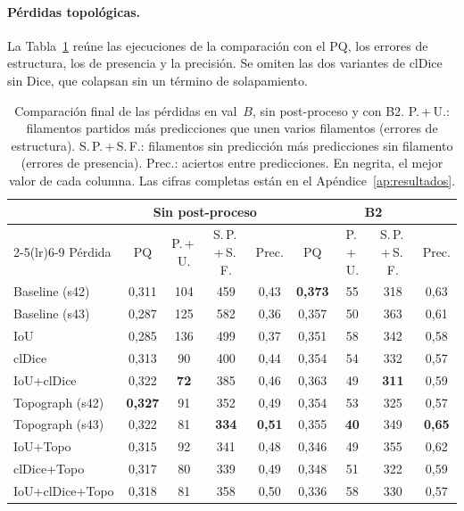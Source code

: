 \paragraph{Pérdidas topológicas.} La Tabla~\ref{tab:conclusion} reúne
las ejecuciones de la comparación con el PQ, los errores de estructura,
los de presencia y la precisión. Se omiten las dos variantes de clDice
sin Dice, que colapsan sin un término de solapamiento.

\begin{table}[ht]
\centering
\footnotesize
\setlength{\tabcolsep}{4pt}
\begin{tabular}{@{}lcccccccc@{}}
\toprule
 & \multicolumn{4}{c}{Sin post-proceso} & \multicolumn{4}{c}{B2}\\
\cmidrule(lr){2-5}\cmidrule(lr){6-9}
Pérdida & PQ & P.\,+\,U. & S.\,P.\,+\,S.\,F. & Prec.
        & PQ & P.\,+\,U. & S.\,P.\,+\,S.\,F. & Prec.\\
\midrule
Baseline (s42)  & 0,311 & 104 & 459 & 0,43 & \textbf{0,373} & 55 & 318 & 0,63\\
Baseline (s43)  & 0,287 & 125 & 582 & 0,36 & 0,357 & 50 & 363 & 0,61\\
IoU             & 0,285 & 136 & 499 & 0,37 & 0,351 & 58 & 342 & 0,58\\
clDice          & 0,313 & 90  & 400 & 0,44 & 0,354 & 54 & 332 & 0,57\\
IoU+clDice      & 0,322 & \textbf{72} & 385 & 0,46 & 0,363 & 49 & \textbf{311} & 0,59\\
\midrule
Topograph (s42) & \textbf{0,327} & 91 & 352 & 0,49 & 0,354 & 53 & 325 & 0,57\\
Topograph (s43) & 0,322 & 81 & \textbf{334} & \textbf{0,51} & 0,355 & \textbf{40} & 349 & \textbf{0,65}\\
IoU+Topo        & 0,315 & 92 & 341 & 0,48 & 0,346 & 49 & 355 & 0,62\\
clDice+Topo     & 0,317 & 80 & 339 & 0,49 & 0,348 & 51 & 322 & 0,59\\
IoU+clDice+Topo & 0,318 & 81 & 358 & 0,50 & 0,336 & 58 & 330 & 0,57\\
\bottomrule
\end{tabular}
\caption{Comparación final de las pérdidas en val~$B$, sin post-proceso
y con B2. P.\,+\,U.: filamentos partidos más predicciones que unen
varios filamentos (errores de estructura). S.\,P.\,+\,S.\,F.: filamentos
sin predicción más predicciones sin filamento (errores de presencia).
Prec.: aciertos entre predicciones. En negrita, el mejor valor de cada
columna. Las cifras completas están en el Apéndice~\ref{ap:resultados}.}
\label{tab:conclusion}
\end{table}

